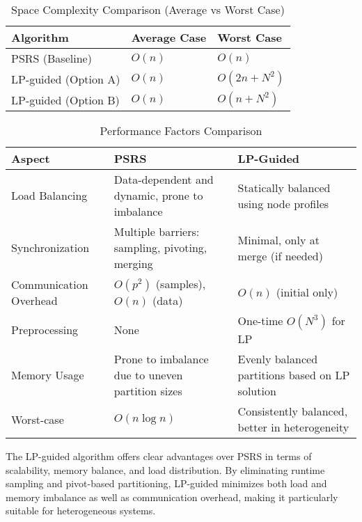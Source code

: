 \documentclass[]{interact}
\theoremstyle{plain}
\theoremstyle{definition}
\theoremstyle{remark}
\begin{document}
\begin{table}[h]
\centering
\footnotesize
\renewcommand{\arraystretch}{1.5} %
\begin{tabular}{|p{4.35cm}|p{4.35cm}|p{4.35cm}|}
\hline
\textbf{Algorithm} & \textbf{Average Case} & \textbf{Worst Case} \\
\hline
PSRS (Baseline) & $O(n)$ & $O(n)$ \\
\hline
LP-guided (Option A) & $O(n)$ & $O(2n + N^2)$ \\
\hline
LP-guided (Option B) & $O(n)$ & $O(n + N^2)$ \\
\hline
\end{tabular}
\caption{Space Complexity Comparison (Average vs Worst Case)}
\end{table}



    
\begin{table}[H]
\footnotesize
\renewcommand{\arraystretch}{1.5} %
\begin{tabular}{|p{3cm}|p{5cm}|p{5cm}|}
\hline
\textbf{Aspect} & \textbf{PSRS} & \textbf{LP-Guided} \\
\hline
Load Balancing & Data-dependent and dynamic, prone to imbalance & Statically balanced using node profiles \\
\hline
Synchronization & Multiple barriers: sampling, pivoting, merging & Minimal, only at merge (if needed) \\
\hline
Communication Overhead & $O(p^2)$ (samples), $O(n)$ (data) & $O(n)$ (initial only) \\
\hline
Preprocessing & None & One-time $O(N^3)$ for LP \\
\hline
Memory Usage & Prone to imbalance due to uneven partition sizes & Evenly balanced partitions based on LP solution \\
\hline
Worst-case & $O(n \log n)$ & Consistently balanced, better in heterogeneity \\
\hline
\end{tabular}
\caption{Performance Factors Comparison}
\end{table}

The LP-guided algorithm offers clear advantages over PSRS in terms of scalability, memory balance, and load distribution. By eliminating runtime sampling and pivot-based partitioning, LP-guided minimizes both load and memory imbalance as well as communication overhead, making it particularly suitable for heterogeneous systems.
\end{document}
